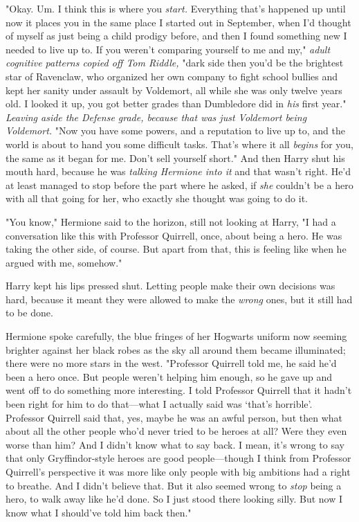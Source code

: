 "Okay. Um. I think this is where you \emph{start.} Everything that's happened
up until now{\el} it places you in the same place I started out in
September, when I'd thought of myself as just being a child prodigy before, and
then I found something new I needed to live up to. If you weren't comparing
yourself to me and my," \emph{adult cognitive patterns copied off Tom Riddle,}
"dark side{\el} then you'd be the brightest star of Ravenclaw, who organized
her own company to fight school bullies and kept her sanity under assault by
Voldemort, all while she was only twelve years old. I looked it up, you got
better grades than Dumbledore did in \emph{his} first year." \emph{Leaving
aside the Defense grade, because that was just Voldemort being Voldemort.} "Now
you have some powers, and a reputation to live up to, and the world is about to
hand you some difficult tasks. That's where it all \emph{begins} for you, the
same as it began for me. Don't sell yourself short." And then Harry shut his
mouth hard, because he was \emph{talking Hermione into it} and that wasn't
right. He'd at least managed to stop before the part where he asked, if
\emph{she} couldn't be a hero with all that going for her, who exactly she
thought was going to do it.

"You know," Hermione said to the horizon, still not looking at Harry, "I had a
conversation like this with Professor Quirrell, once, about being a hero. He
was taking the other side, of course. But apart from that, this is feeling like
when he argued with me, somehow."

Harry kept his lips pressed shut. Letting people make their own decisions was
hard, because it meant they were allowed to make the \emph{wrong} ones, but it
still had to be done.

Hermione spoke carefully, the blue fringes of her Hogwarts uniform now seeming
brighter against her black robes as the sky all around them became illuminated;
there were no more stars in the west. "Professor Quirrell told me, he said he'd
been a hero once. But people weren't helping him enough, so he gave up and went
off to do something more interesting. I told Professor Quirrell that it hadn't
been right for him to do that---what I actually said was `that's horrible'.
Professor Quirrell said that, yes, maybe he was an awful person, but then what
about all the other people who'd never tried to be heroes at all? Were they
even worse than him? And I didn't know what to say back. I mean, it's wrong to
say that only Gryffindor-style heroes are good people---though I think from
Professor Quirrell's perspective it was more like only people with big
ambitions had a right to breathe. And I didn't believe that. But it also seemed
wrong to \emph{stop} being a hero, to walk away like he'd done. So I just stood
there looking silly. But now I know what I should've told him back then."

